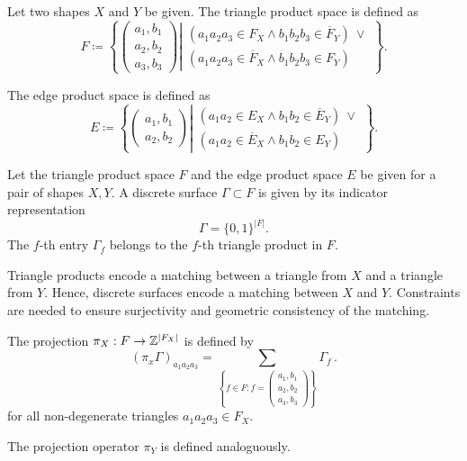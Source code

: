 \begin{definition}
	Let two shapes $X$ and $Y$ be given.
	The triangle product space is defined as
	\begin{equation}
		F \coloneqq \left\{ 
		\begin{pmatrix}
			a_1, b_1 \\
			a_2, b_2 \\ 
			a_3, b_3
		\end{pmatrix} \left|
		\begin{array}{ll}
			(a_1 a_2 a_3 \in F_X \wedge b_1 b_2 b_3 \in \overline{F}_Y )~\vee \\
			(a_1 a_2 a_3 \in \overline{F}_X \wedge b_1 b_2 b_3 \in {F}_Y ) 
		\end{array} \right.
		\right\}.\nonumber
	\end{equation}
	
	The edge product space is defined as
	\begin{equation}
		E \coloneqq \left\{ 
		\begin{pmatrix}
			a_1, b_1 \\
			a_2, b_2
		\end{pmatrix} \left|
		\begin{array}{ll}
			(a_1 a_2 \in E_X \wedge b_1 b_2 \in \overline{E}_Y )~\vee\\
			(a_1 a_2 \in \overline{E}_X \wedge b_1 b_2 \in {E}_Y )
		\end{array} \right.
		\right\}.\nonumber
	\end{equation}
\end{definition}

\begin{definition}
	Let the triangle product space $F$ and the edge product space $E$ be given for a pair of shapes $X, Y$. A discrete surface $\Gamma \subset F$  is given by its indicator representation 
	\begin{equation}
		\Gamma = \{0, 1\}^{|F|}.
	\end{equation}
	The $f$-th entry $\Gamma_f$ belongs to the $f$-th triangle product in $F$.
\end{definition}
Triangle products encode a matching between a triangle from $X$ and a triangle from $Y$. Hence, discrete surfaces encode a matching between $X$ and $Y$. Constraints are needed to ensure surjectivity and geometric consistency of the matching. 

\begin{definition}
	The projection $\pi_X : F \rightarrow \mathbb{Z}^{\lvert F_X\rvert}$ is defined by
	\begin{equation}
        (\pi_x \Gamma)_{a_1 a_2 a_3} = \sum_{\left\{ f \in F : f = \begin{pmatrix} a_1, b_1\\ a_2, b_2 \\ a_3, b_3 \end{pmatrix}\right\}} \Gamma_f\,.
	\end{equation}
    for all non-degenerate triangles $a_1 a_2 a_3 \in F_X$.

	The projection operator $\pi_Y$ is defined analoguously.
\end{definition}

